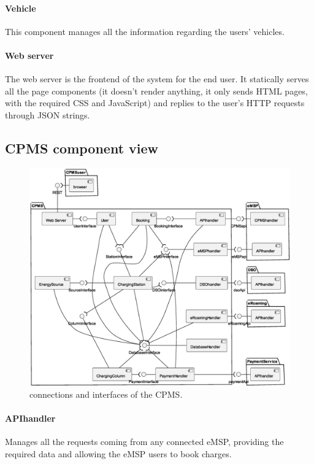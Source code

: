\paragraph{Vehicle} This component manages all the information regarding the users' vehicles.

\paragraph{Web server} The web server is the frontend of the system for the end user. It statically serves all the page components (it doesn't render anything, it only sends HTML pages, with the required CSS and JavaScript) and replies to the user's HTTP requests through JSON strings.

\subsection{CPMS component view}

\begin{figure}[h!]
    \centering
    \includegraphics[width=\columnwidth]{./images/components/cpms}
    \caption{connections and interfaces of the CPMS.}
\end{figure}

\paragraph {APIhandler} Manages all the requests coming from any connected eMSP, providing the required data and allowing the eMSP users to book charges.

